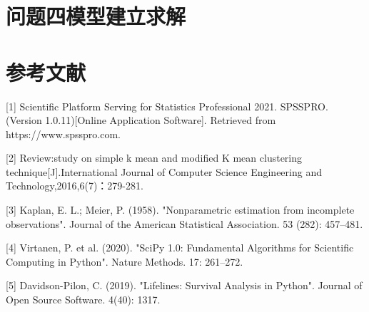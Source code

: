 \documentclass{article}
\begin{document}
\section{\textbf{问题四模型建立求解}}
\section{\textbf{参考文献}}
 [1] Scientific Platform Serving for Statistics Professional 2021. SPSSPRO.
(Version 1.0.11)[Online Application Software]. Retrieved from https://www.spsspro.com.

[2] Review:study on simple k mean and modified K mean clustering
technique[J].International Journal of Computer Science Engineering and Technology,2016,6(7)：279-281.

[3] Kaplan, E. L.; Meier, P. (1958). "Nonparametric estimation from incomplete
observations". Journal of the American Statistical Association. 53 (282): 457–481.

[4] Virtanen, P. et al. (2020). "SciPy 1.0: Fundamental Algorithms for Scientific
Computing in Python". Nature Methods. 17: 261–272.

[5] Davidson-Pilon, C. (2019). "Lifelines: Survival Analysis in Python". Journal
of Open Source Software. 4(40): 1317.
\end{document}
